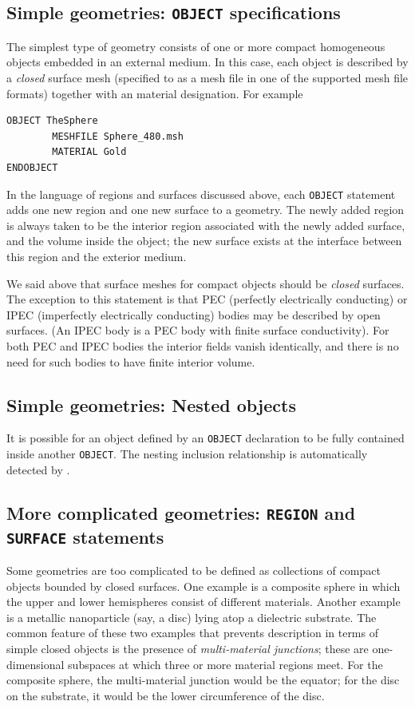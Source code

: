 \documentclass[letterpaper]{article}
\begin{document}
\subsection*{Simple geometries: \texttt{OBJECT} specifications}

The simplest type of \lss geometry consists of one or more
compact homogeneous objects embedded in an external 
medium. In this case, each object is described by a 
\textit{closed} surface mesh (specified to \lss
as a mesh file in one of the supported mesh file 
formats) together with an material designation.
For example

\begin{verbatim}
OBJECT TheSphere
        MESHFILE Sphere_480.msh
        MATERIAL Gold
ENDOBJECT
\end{verbatim}

In the language of regions and surfaces discussed above,
each \texttt{OBJECT} statement adds one new region and 
one new surface to a geometry. The newly added region 
is always taken to be the interior region associated
with the newly added surface, and the 
volume inside the object; the new surface exists at 
the interface between this region and the exterior
medium.

We said above that surface meshes for compact objects 
should be \textit{closed} surfaces. The exception to 
this statement is that PEC (perfectly electrically
conducting) or IPEC (imperfectly electrically 
conducting) bodies may be described by open surfaces.
(An IPEC body is a PEC body with finite surface 
conductivity). For both PEC and IPEC bodies the
interior fields vanish identically, and there
is no need for such bodies to have finite
interior volume.

\subsection*{Simple geometries: Nested objects} 

It is possible for an object defined by an
\texttt{OBJECT} declaration to be fully 
contained inside another \texttt{OBJECT}. 
The nesting inclusion relationship is automatically 
detected by \ls. 

\subsection*{More complicated geometries: \texttt{REGION}
             and \texttt{SURFACE} statements}

Some geometries are too complicated to be defined 
as collections of compact objects bounded by closed 
surfaces. One example is a composite sphere in which 
the upper and lower hemispheres consist of different 
materials. Another example is a metallic nanoparticle 
(say, a disc) lying atop a dielectric substrate. The 
common feature of these two examples that prevents 
description in terms of simple closed objects is the 
presence of \textit{multi-material junctions}; these
are one-dimensional subspaces at which three
or more material regions meet. 
For the composite sphere, the multi-material junction 
would be the equator; for the disc on the substrate, 
it would be the lower circumference of the disc.
\end{document}
